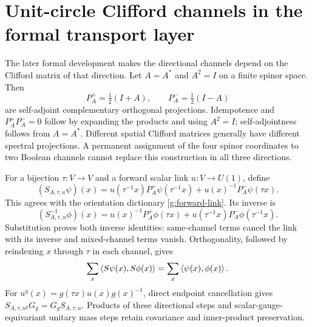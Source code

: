 


\section{Unit-circle Clifford channels in the formal transport layer}\label{g:circle-transport}

The later formal development makes the directional channels depend on the Clifford matrix of that direction. Let $A=A^*$ and $A^2=I$ on a finite spinor space. Then
\begin{equation}\label{g:clifford-projections}
 P^+_A=\tfrac12(I+A),\qquad P^-_A=\tfrac12(I-A)
\end{equation}
are self-adjoint complementary orthogonal projections. Idempotence and $P_A^+P_A^-=0$ follow by expanding the products and using $A^2=I$; self-adjointness follows from $A=A^*$. Different spatial Clifford matrices generally have different spectral projections. A permanent assignment of the four spinor coordinates to two Boolean channels cannot replace this construction in all three directions.

For a bijection $\tau:V\to V$ and a forward scalar link $u:V\to U(1)$, define
\begin{equation}\label{g:clifford-shift}
 (S_{A,\tau,u}\psi)(x)
 =u(\tau^{-1}x)P_A^+\psi(\tau^{-1}x)
 +u(x)^{-1}P_A^-\psi(\tau x).
\end{equation}
This agrees with the orientation dictionary \eqref{g:forward-link}. Its inverse is
\begin{equation}\label{g:clifford-inverse}
 (S_{A,\tau,u}^{-1}\phi)(x)
 =u(x)^{-1}P_A^+\phi(\tau x)
 +u(\tau^{-1}x)P_A^-\phi(\tau^{-1}x).
\end{equation}
Substitution proves both inverse identities: same-channel terms cancel the link with its inverse and mixed-channel terms vanish. Orthogonality, followed by reindexing $x$ through $\tau$ in each channel, gives
\begin{equation}\label{g:clifford-inner}
 \sum_x\left\langle S\psi(x),S\phi(x)\right\rangle
 =\sum_x\left\langle\psi(x),\phi(x)\right\rangle.
\end{equation}
For $u^g(x)=g(\tau x)u(x)g(x)^{-1}$, direct endpoint cancellation gives $S_{A,\tau,u^g}G_g=G_gS_{A,\tau,u}$. Products of these directional steps and scalar-gauge-equivariant unitary mass steps retain covariance and inner-product preservation.

